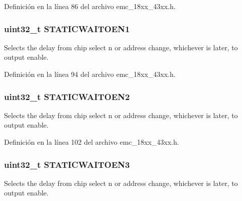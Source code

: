 Definición en la línea 86 del archivo emc\+\_\+18xx\+\_\+43xx.\+h.

\subsubsection[{\texorpdfstring{S\+T\+A\+T\+I\+C\+W\+A\+I\+T\+O\+E\+N1}{STATICWAITOEN1}}]{ uint32\+\_\+t S\+T\+A\+T\+I\+C\+W\+A\+I\+T\+O\+E\+N1}\hypertarget{struct_l_p_c___e_m_c___t_aba8b5b46e5e1afb4638d2e27d5d79860}{}\label{struct_l_p_c___e_m_c___t_aba8b5b46e5e1afb4638d2e27d5d79860}
Selects the delay from chip select n or address change, whichever is later, to output enable. 

Definición en la línea 94 del archivo emc\+\_\+18xx\+\_\+43xx.\+h.

\subsubsection[{\texorpdfstring{S\+T\+A\+T\+I\+C\+W\+A\+I\+T\+O\+E\+N2}{STATICWAITOEN2}}]{ uint32\+\_\+t S\+T\+A\+T\+I\+C\+W\+A\+I\+T\+O\+E\+N2}\hypertarget{struct_l_p_c___e_m_c___t_a137cecf9b0c0ca487d2b4a894e002d8b}{}\label{struct_l_p_c___e_m_c___t_a137cecf9b0c0ca487d2b4a894e002d8b}
Selects the delay from chip select n or address change, whichever is later, to output enable. 

Definición en la línea 102 del archivo emc\+\_\+18xx\+\_\+43xx.\+h.

\subsubsection[{\texorpdfstring{S\+T\+A\+T\+I\+C\+W\+A\+I\+T\+O\+E\+N3}{STATICWAITOEN3}}]{ uint32\+\_\+t S\+T\+A\+T\+I\+C\+W\+A\+I\+T\+O\+E\+N3}\hypertarget{struct_l_p_c___e_m_c___t_a06f7053d31f24ecab94cf855b4647beb}{}\label{struct_l_p_c___e_m_c___t_a06f7053d31f24ecab94cf855b4647beb}
Selects the delay from chip select n or address change, whichever is later, to output enable. 

